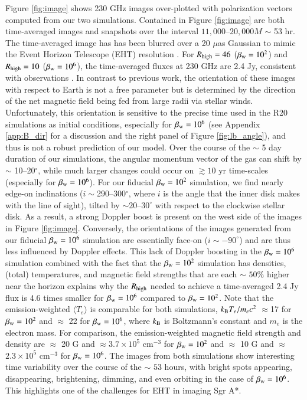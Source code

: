\documentclass[twocolumn,twocolappendix,apjl,appendixfloats]{aastex63}
\begin{document}
Figure \ref{fig:image} shows 230 GHz images over-plotted with polarization vectors computed from our two simulations.    Contained in Figure \ref{fig:image} are both time-averaged images and snapshots over the interval $11,000$--$20,000 M$ $\sim$ 53 hr.  The time-averaged image has has been blurred over a 20 $\mu$as Gaussian to mimic the Event Horizon Telescope (EHT) resolution \citep{EHT1}.   For $R_{\rm high} = 46$  ($\beta_{\rm w}=10^2$) and $R_{\rm high} = 10$ ($\beta_{\rm w}=10^6$), the time-averaged fluxes at 230 GHz are 2.4 Jy, consistent with observations \citep{Doeleman2008}.  In contrast to previous work, the orientation of these images with respect to Earth is not a free parameter but is determined by the direction of the net magnetic field being fed from large radii via stellar winds.  Unfortunately, this orientation is sensitive to the precise time used in the R20 simulations as initial conditions, especially for $\beta_{\rm w}=10^6$ (see Appendix \ref{app:B_dir} for a discussion and the right panel of Figure \ref{fig:lb_angle}), and thus is not a robust prediction of our model.   Over the course of the $\sim$ 5 day duration of our simulations, the angular momentum vector of the gas can shift by $\sim$ 10--20$^\circ$, while much larger changes could occur on $\gtrsim 10$ yr time-scales (especially for $\beta_{\rm w} = 10^6$).
For our fiducial $\beta_{\rm w}=10^2$ simulation, we find nearly edge-on inclinations ($i \sim $290--300$^\circ$, where $i$ is the angle that the inner disk makes with the line of sight), tilted by $\sim 20$--$30^\circ$ with respect to the clockwise stellar disk.
As a result, a strong Doppler boost is present on the west side of the images in Figure \ref{fig:image}. 
Conversely, the orientations of the images generated from our fiducial $\beta_{\rm w}=10^6$ simulation are essentially face-on ($i \sim -90^\circ$) and are thus less influenced by Doppler effects. 
This lack of Doppler boosting in the $\beta_{\rm w} =10^6$ simulation combined with the fact that the $\beta_{\rm w}=10^2$ simulation has densities,  (total) temperatures, and magnetic field strengths that are each $\sim$ $50 \%$ higher near the horizon explains why the $R_{\rm high}$ needed to achieve a time-averaged 2.4 Jy flux is 4.6 times smaller for $\beta_{\rm w}=10^6$ compared to $\beta_{\rm w}=10^2$.  Note that the emission-weighted $\langle T_e\rangle$ is comparable for both simulations, $k_{\rm B} T_e / m_e c^2$ $\approx$17 for $\beta_{\rm w} = 10^2$ and $\approx$ 22 for $\beta_{\rm w} = 10^6$, where $k_{\rm B}$ is Boltzmann's constant and $m_e$ is the electron mass. For comparison, the emission-weighted magnetic field strength and density are $\approx$ 20 G and $\approx 3.7 \times 10^5$ cm$^{-3}$ for $\beta_{\rm w}=10^2$ and $\approx $ 10 G  and $\approx$ $2.3 \times 10^{5}$ cm$^{-3}$ for $\beta_{\rm w}=10^6$.
The images from both simulations show interesting time variability over the course of the $\sim$ $53$ hours, with bright spots appearing, disappearing, brightening, dimming, and even orbiting in the case of $\beta_{\rm w}=10^6$.   This highlights one of the challenges for EHT in imaging Sgr A*.  
\end{document}
